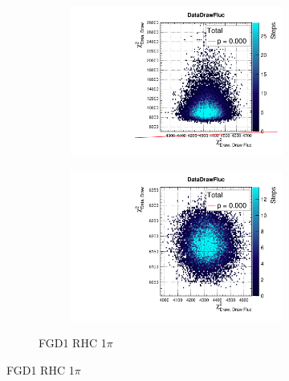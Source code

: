 \begin{figure}[h]
\begin{subfigure}[t]{\textwidth}
\begin{subfigure}[t]{0.24\textwidth}
			\includegraphics[width=\textwidth, trim={0mm 0mm 0mm 8mm}, clip,page=128]{figures/mach3/2018/data/2018a_FixedCov_RedCov_Mpi_Data_merge_PriorPred_procs}
		\end{subfigure}
		\begin{subfigure}[t]{0.24\textwidth}
			\includegraphics[width=\textwidth, trim={0mm 0mm 0mm 8mm}, clip,page=128]{figures/mach3/2018/data/2018a_FixedCov_RedCov_Mpi_Data_merge_PostPredStore_FullLLH_procs}
		\end{subfigure}
		\caption{FGD1 \numu RHC 1$\pi$}
	\end{subfigure}
	

\end{figure}
